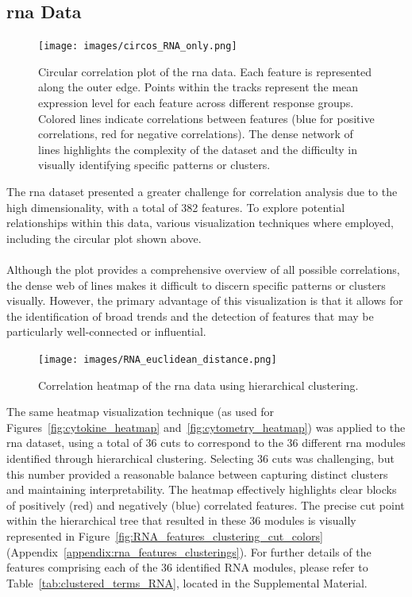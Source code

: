 \documentclass[12pt,a4paper]{report}
\begin{document}
\subsection{\acrshort{rna} Data}
\begin{figure}[H]
  \centering
  \texttt{[image: images/circos\_RNA\_only.png]}
 \caption[\acrshort{rna} data correlations circular]{Circular correlation plot of the \acrshort{rna} data. Each feature is represented along the outer edge. Points within the tracks represent the mean expression level for each feature across different response groups. Colored lines indicate correlations between features (blue for positive correlations, red for negative correlations). The dense network of lines highlights the complexity of the dataset and the difficulty in visually identifying specific patterns or clusters.}
  \label{fig:rna_circos}
\end{figure}

The \acrshort{rna} dataset presented a greater challenge for correlation analysis due to the high dimensionality, with a total of 382 features. To explore potential relationships within this data, various visualization techniques where employed, including the circular plot shown above.\\
\\
 Although the plot provides a comprehensive overview of all possible correlations, the dense web of lines makes it difficult to discern specific patterns or clusters visually. However, the primary advantage of this visualization is that it allows for the identification of broad trends and the detection of features that may be particularly well-connected or influential.

\begin{figure}[H]
  \centering
  \texttt{[image: images/RNA\_euclidean\_distance.png]}
  \caption[\acrshort{rna} data correlations]{Correlation heatmap of the \acrshort{rna} data using hierarchical clustering.}
  \label{fig:RNA_heatmap}
\end{figure}

\noindent
The same heatmap visualization technique (as used for Figures~\ref{fig:cytokine_heatmap} and~\ref{fig:cytometry_heatmap}) was applied to the \acrshort{rna} dataset, using a total of 36 cuts to correspond to the 36 different \acrshort{rna} modules identified through hierarchical clustering. Selecting 36 cuts was challenging, but this number provided a reasonable balance between capturing distinct clusters and maintaining interpretability. The heatmap effectively highlights clear blocks of positively (red) and negatively (blue) correlated features. The precise cut point within the hierarchical tree that resulted in these 36 modules is visually represented in Figure~\ref{fig:RNA_features_clustering_cut_colors} (Appendix~\ref{appendix:rna_features_clusterings}). For further details of the features comprising each of the 36 identified RNA modules, please refer to Table~\ref{tab:clustered_terms_RNA}, located in the Supplemental Material.
\end{document}
